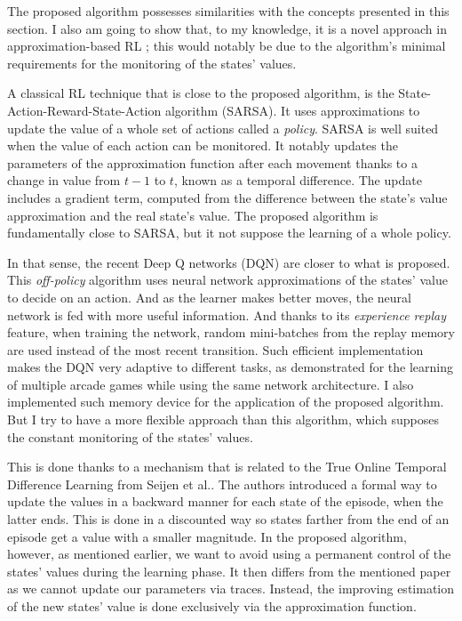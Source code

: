 \documentclass[scrartcl, 10.5 pt, conference]{ieeeconf}
\begin{document}
The proposed algorithm possesses similarities with the concepts presented in this section. I also am going to show that, to my knowledge, it is a novel approach in approximation-based RL ; this would notably be due to the algorithm's minimal requirements for the monitoring of the states' values.

A classical RL technique that is close to the proposed algorithm, is the State-Action-Reward-State-Action algorithm (SARSA). It uses approximations to update the value of a whole set of actions called a \textit{policy}. SARSA is well suited when the value of each action can be monitored. It notably updates the parameters of the approximation function after each movement thanks to a change in value from $t-1$ to $t$, known as a temporal difference. The update includes a gradient term, computed from the difference between the state's value approximation and the real state's value. The proposed algorithm is fundamentally close to SARSA, but it not suppose the learning of a whole policy.

In that sense, the recent Deep Q networks (DQN) are closer to what is proposed. This \textit{off-policy} algorithm uses neural network approximations of the states' value to decide on an action. And as the learner makes better moves, the neural network is fed with more useful information. And thanks to its \textit{experience replay} feature, when training the network, random mini-batches from the replay memory are used instead of the most recent transition. Such efficient implementation makes the DQN very adaptive to different tasks, as demonstrated for the learning of multiple arcade games while using the same network architecture. I also implemented such memory device for the application of the proposed algorithm. But I try to have a more flexible approach than this algorithm, which supposes the constant monitoring of the states' values. 

This is done thanks to a mechanism that is related to the True Online Temporal Difference Learning from Seijen et al.. The authors introduced a formal way to update the values in a backward manner for each state of the episode, when the latter ends. This is done in a discounted way so states farther from the end of an episode get a value with a smaller magnitude. In the proposed algorithm, however, as mentioned earlier, we want to avoid using a permanent control of the states' values during the learning phase. It then differs from the mentioned paper as we cannot update our parameters via traces. Instead, the improving estimation of the new states' value is done exclusively via the approximation function.
\end{document}
